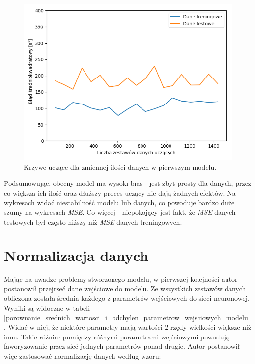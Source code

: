 \documentclass[12pt]{aghdpl}
\newenvironment{tightcenter}{
  \setlength\topsep{0pt}
  \setlength\parskip{0pt}
  \begin{center}
}{
  \end{center}
}
\begin{document}
		\begin{figure}[h]
	 		\begin{tightcenter}
	 			\includegraphics[width = \linewidth]{wykresy/1_pierwszy_model_tworzenie_i_analiza/learning_curves.png}
	 		\end{tightcenter}
	 		
 			\caption{Krzywe uczące dla zmiennej ilości danych w pierwszym modelu.}
			\label{fig: pierwszy_model_learning_curves}
		\end{figure}
		
		Podsumowując, obecny model ma wysoki bias - jest zbyt prosty dla danych, przez co większa ich ilość oraz dłuższy proces uczący nie dają żadnych efektów. Na wykresach widać niestabilność modelu lub danych, co powoduje bardzo duże szumy na wykresach \textit{MSE}. Co więcej - niepokojący jest fakt, że \textit{MSE} danych testowych był często niższy niż \textit{MSE} danych treningowych.
		
		\section{Normalizacja danych} \label{normalizacja_danych}
		Mając na uwadze problemy stworzonego modelu, w pierwszej kolejności autor postanowił przejrzeć dane wejściowe do modelu. Ze wszystkich zestawów danych obliczona została średnia każdego z parametrów wejściowych do sieci neuronowej. Wyniki są widoczne w tabeli \ref{porownanie_srednich_wartosci_i_odchylen_parametrow_wejsciowych_modelu}. Widać w niej, że niektóre parametry mają wartości 2 rzędy wielkości większe niż inne. Takie różnice pomiędzy różnymi parametrami wejściowymi powodują faworyzowanie przez sieć jednych parametrów ponad drugie. Autor postanowił więc zastosować normalizację danych według wzoru:
		
\end{document}
